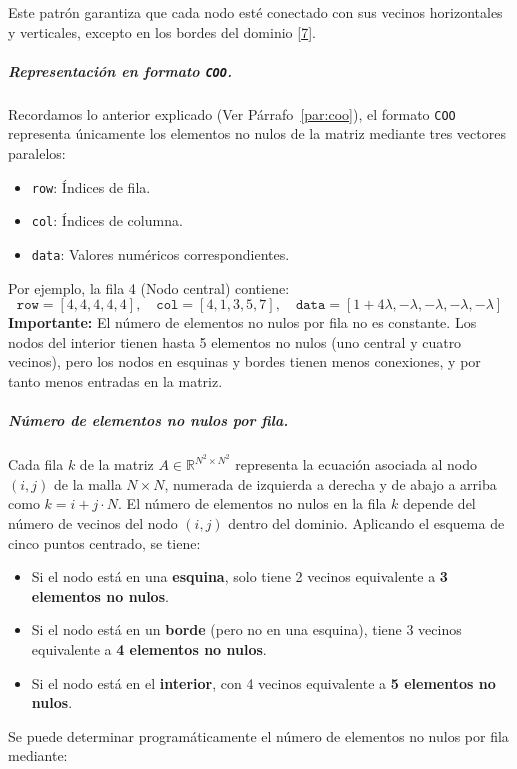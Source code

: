 \documentclass{article}
\begin{document}
Este patrón garantiza que cada nodo esté conectado con sus vecinos horizontales y verticales, excepto en los bordes del dominio [\href{https://upcommons.upc.edu/bitstream/handle/2117/94028/01MLss01de04.pdf}{7}].

\subparagraph{Representación en formato \texttt{COO}.} Recordamos lo anterior explicado (Ver Párrafo~\ref{par:coo}), el formato \texttt{COO} representa únicamente los elementos no nulos de la matriz mediante tres vectores paralelos:

\begin{itemize}
    \item \texttt{row}: Índices de fila.
    \item \texttt{col}: Índices de columna.
    \item \texttt{data}: Valores numéricos correspondientes.
\end{itemize}
Por ejemplo, la fila 4 (Nodo central) contiene:
$$
\texttt{row} = [4, 4, 4, 4, 4], \quad
\texttt{col} = [4, 1, 3, 5, 7], \quad
\texttt{data} = [1+4\lambda, -\lambda, -\lambda, -\lambda, -\lambda]
$$
\textbf{Importante:} El número de elementos no nulos por fila no es constante. Los nodos del interior tienen hasta 5 elementos no nulos (uno central y cuatro vecinos), pero los nodos en esquinas y bordes tienen menos conexiones, y por tanto menos entradas en la matriz.

\subparagraph{Número de elementos no nulos por fila.} 
\label{par:nnz}
Cada fila $k$ de la matriz $A \in \mathbb{R}^{N^2 \times N^2}$ representa la ecuación asociada al nodo $(i,j)$ de la malla $N \times N$, numerada de izquierda a derecha y de abajo a arriba como $k = i + j \cdot N$.
El número de elementos no nulos en la fila $k$ depende del número de vecinos del nodo $(i,j)$ dentro del dominio. Aplicando el esquema de cinco puntos centrado, se tiene:

\begin{itemize}
    \item Si el nodo está en una \textbf{esquina}, solo tiene 2 vecinos equivalente a \textbf{3 elementos no nulos}.
    \item Si el nodo está en un \textbf{borde} (pero no en una esquina), tiene 3 vecinos equivalente a \textbf{4 elementos no nulos}.
    \item Si el nodo está en el \textbf{interior}, con 4 vecinos equivalente a \textbf{5 elementos no nulos}.
\end{itemize}

\noindent Se puede determinar programáticamente el número de elementos no nulos por fila mediante:
\end{document}
